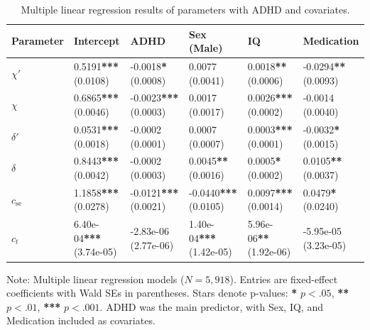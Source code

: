 \begin{table}[H]
\centering
\caption{Multiple linear regression results of parameters with ADHD and covariates.}
\begin{tabularx}{\linewidth}{lXXXXX}
\toprule
\textbf{Parameter} & \textbf{Intercept} & \textbf{ADHD} & \textbf{Sex (Male)} & \textbf{IQ} & \textbf{Medication} \\
\midrule
$\chi'$ & 0.5191\textbf{***} (0.0108) & -0.0018\textbf{*} (0.0008) & 0.0077 (0.0041) & 0.0018\textbf{**} (0.0006) & -0.0294\textbf{**} (0.0093) \\
$\chi$ & 0.6865\textbf{***} (0.0046) & -0.0023\textbf{***} (0.0003) & 0.0017 (0.0017) & 0.0026\textbf{***} (0.0002) & -0.0014 (0.0040) \\
$\delta'$ & 0.0531\textbf{***} (0.0018) & -0.0002 (0.0001) & 0.0007 (0.0007) & 0.0003\textbf{***} (0.0001) & -0.0032\textbf{*} (0.0015) \\
$\delta$ & 0.8443\textbf{***} (0.0042) & -0.0002 (0.0003) & 0.0045\textbf{**} (0.0016) & 0.0005\textbf{*} (0.0002) & 0.0105\textbf{**} (0.0037) \\
$c_{\mathrm{se}}$ & 1.1858\textbf{***} (0.0278) & -0.0121\textbf{***} (0.0021) & -0.0440\textbf{***} (0.0105) & 0.0097\textbf{***} (0.0014) & 0.0479\textbf{*} (0.0240) \\
$c_t$ & 6.40e-04\textbf{***} (3.74e-05) & -2.83e-06 (2.77e-06) & 1.40e-04\textbf{***} (1.42e-05) & 5.96e-06\textbf{**} (1.92e-06) & -5.95e-05 (3.23e-05) \\
\bottomrule
\end{tabularx}

\vspace{1mm}
\begin{minipage}{\textwidth} %
    \footnotesize \noindent Note: Multiple linear regression models ($N=5,918$). Entries are fixed-effect coefficients with Wald SEs in parentheses. Stars denote p-values: \textbf{*} $p<.05$, \textbf{**} $p<.01$, \textbf{***} $p<.001$. ADHD was the main predictor, with Sex, IQ, and Medication included as covariates.
\end{minipage}
\label{tab:lm_pomdp}
\end{table}